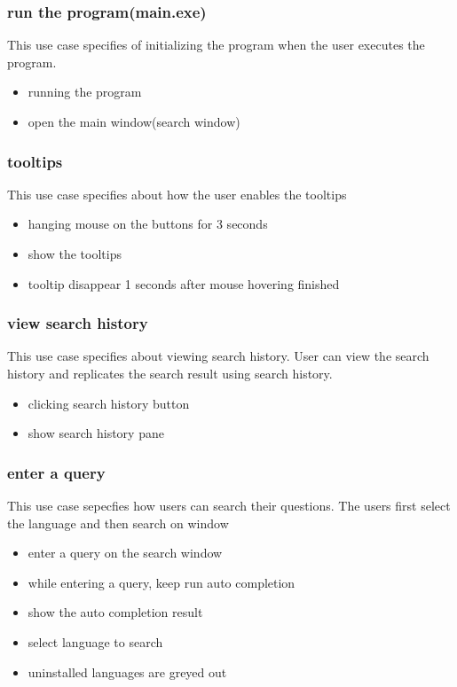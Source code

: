 \documentclass[conference]{IEEEtran}
\begin{document}
\subsubsection{run the program(main.exe)}
This use case specifies of initializing the program when the user executes the program.
\begin{itemize}
  \item running the program
  \item open the main window(search window)
\end{itemize}
\textit{}



\subsubsection{tooltips}
This use case specifies about how the user enables the tooltips
\begin{itemize}
  \item hanging mouse on the buttons for 3 seconds
  \item show the tooltips
  \item tooltip disappear 1 seconds after mouse hovering finished
\end{itemize}
\textit{}

\subsubsection{view search history}
This use case specifies about viewing search history. User can view the search history and replicates the search result using search history.
\begin{itemize}
  \item clicking search history button
  \item show search history pane
\end{itemize}
\textit{}


\subsubsection{enter a query}
This use case sepecfies how users can search their questions. The users first select the language and then search on window
\begin{itemize}
  \item enter a query on the search window
  \item while entering a query, keep run auto completion
  \item show the auto completion result
  \item select language to search
  \item uninstalled languages are greyed out
\end{itemize}
\textit{}
\end{document}
